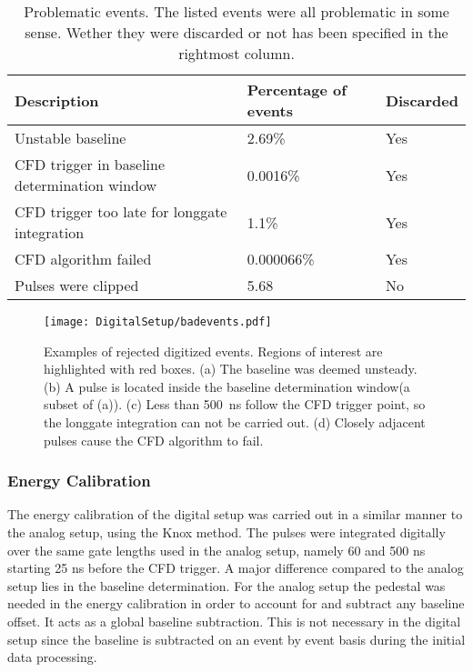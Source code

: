 \documentclass[main.tex]{subfiles}
\begin{document}
\begin{table}[]
\begin{tabular}{|l|l|l|}
\hline
\textbf{Description}                          & \textbf{Percentage of events} & \textbf{Discarded} \\ \hline
Unstable baseline                             & 2.69\%                        & Yes                \\ \hline
CFD trigger in baseline determination window  & 0.0016\%                      & Yes                \\ \hline
CFD trigger too late for longgate integration & 1.1\%                         & Yes                \\ \hline
CFD algorithm failed                          & 0.000066\%                    & Yes                \\ \hline
Pulses were clipped                           & 5.68                          & No                 \\ \hline
\end{tabular}
\caption[Problematic events.]{Problematic events. The listed events were all problematic in some sense. Wether they were discarded or not has been specified in the rightmost column.}
\end{table}

\begin{figure}[ht!]
    \centering
        \texttt{[image: DigitalSetup/badevents.pdf]}
        \caption[Examples of rejected digitized events]{Examples of rejected digitized events. Regions of interest are highlighted with red boxes. (a) The baseline was deemed unsteady. (b) A pulse is located inside the baseline determination window(a subset of (a)). (c) Less than \SI{500}{ns} follow the CFD trigger point, so the longgate integration can not be carried out. (d) Closely adjacent pulses cause the CFD algorithm to fail.}
    \label{fig:badevents} 
\end{figure}
\newpage
\subsubsection{Energy Calibration}
The energy calibration of the digital setup was carried out in a similar manner to the analog setup, using the Knox method. The pulses were integrated digitally over the same gate lengths used in the analog setup, namely 60 and 500 ns starting 25 ns before the CFD trigger. A major difference compared to the analog setup lies in the baseline determination. For the analog setup the pedestal was needed in the energy calibration in order to account for and subtract any baseline offset. It acts as a global baseline subtraction. This is not necessary in the digital setup since the baseline is subtracted on an event by event basis during the initial data processing. 
\end{document}
